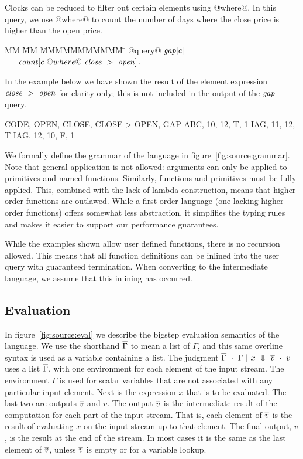 Clocks can be reduced to filter out certain elements using @where@.
In this query, we use @where@ to count the number of days where the close price is higher than the open price.
\begin{tabbing}
MM \= MM \= MMMMMMMMMMM \= \kill
@query@ 
$\mathit{gap}[c]$                                        \\
 \> $=$  \> $\mathit{count}[c~@where@~\mathit{close}~>~\mathit{open}]$.       \\
\end{tabbing}

In the example below we have shown the result of the element expression $\mathit{close}~>~\mathit{open}$ for clarity only; this is not included in the output of the $\mathit{gap}$ query.
\begin{code}
CODE, OPEN, CLOSE, CLOSE > OPEN, GAP
ABC,    10,    12,            T,   1
IAG,    11,    12,            T
IAG,    12,    10,            F,   1
\end{code}



We formally define the grammar of the language in figure~\ref{fig:source:grammar}.
Note that general application is not allowed: arguments can only be applied to primitives and named functions.
Similarly, functions and primitives must be fully applied.
This, combined with the lack of lambda construction, means that higher order functions are outlawed.
While a first-order language (one lacking higher order functions) offers somewhat less abstraction, it simplifies the typing rules and makes it easier to support our performance guarantees.

While the examples shown allow user defined functions, there is no recursion allowed.
This means that all function definitions can be inlined into the user query with guaranteed termination.
When converting to the intermediate language, we assume that this inlining has occurred.

\subsection{Evaluation}



In figure~\ref{fig:source:eval} we describe the bigstep evaluation semantics of the language.
We use the shorthand $\overline{\Gamma}$ to mean a list of $\Gamma$, and this same overline syntax is used as a variable containing a list.
The judgment $\overline{\Gamma} ~\cdot~ \Gamma ~|~ x ~\Downarrow~ \overline{v} ~\cdot~ v$ uses a list $\overline{\Gamma}$, with one environment for each element of the input stream.
The environment $\Gamma$ is used for scalar variables that are not associated with any particular input element.
Next is the expression $x$ that is to be evaluated.
The last two are outputs $\overline{v}$ and $v$.
The output $\overline{v}$ is the intermediate result of the computation for each part of the input stream.
That is, each element of $\overline{v}$ is the result of evaluating $x$ on the input stream up to that element.
The final output, $v$, is the result at the end of the stream.
In most cases it is the same as the last element of $\overline{v}$, unless $\overline{v}$ is empty or for a variable lookup.

